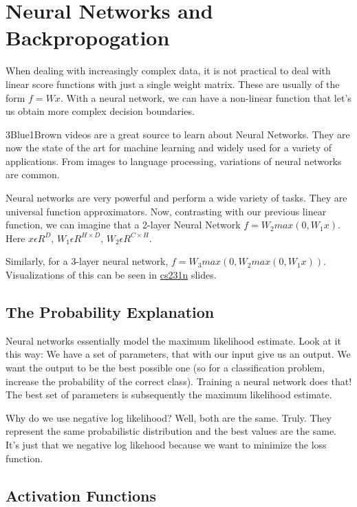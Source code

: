 \chapter{Neural Networks and Backpropogation}

When dealing with increasingly complex data, it is not practical to deal with linear score functions with just a single weight matrix. These are usually of the form $f = Wx$. With a neural network, we can have a non-linear function that let's us obtain more complex decision boundaries.

3Blue1Brown videos are a great source to learn about Neural Networks. They are now the state of the art for machine learning and widely used for a variety of applications. From images to language processing, variations of neural networks are common. 

Neural networks are very powerful and perform a wide variety of tasks. They are universal function approximators. Now, contrasting with our previous linear function, we can imagine that a 2-layer Neural Network $f=W_2 max(0, W_1 x)$. Here $x \epsilon R^D$, $W_1 \epsilon R^{H\times D}$, $W_2 \epsilon R^{C \times H}$.

Similarly, for a 3-layer neural network, $f=W_3max(0, W_2max(0, W_1x))$. Visualizations of this can be seen in \href{http://cs231n.stanford.edu/slides/2020/lecture_4.pdf}{cs231n} slides.

\section{The Probability Explanation}

Neural networks essentially model the maximum likelihood estimate. Look at it this way: We have a set of parameters, that with our input give us an output. We want the output to be the best possible one (so for a classification problem, increase the probability of the correct class). Training a neural network does that! The best set of parameters is subsequently the maximum likelihood estimate. 

Why do we use negative log likelihood? Well, both are the same. Truly. They represent the same probabilistic distribution and the best values are the same. It's just that we negative log likehood because we want to minimize the loss function.

\section{Activation Functions}

